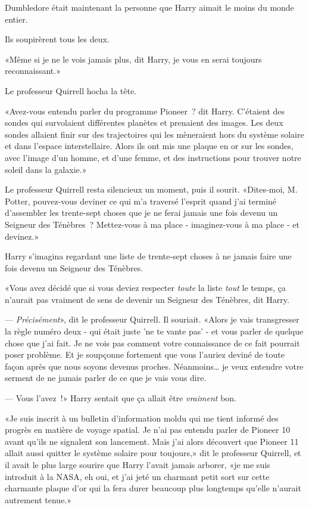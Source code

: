 Dumbledore était maintenant la personne que Harry aimait le moins du monde entier.

Ils soupirèrent tous les deux.

«Même si je ne le vois jamais plus, dit Harry, je vous en serai toujours reconnaissant.»

Le professeur Quirrell hocha la tête.

«Avez-vous entendu parler du programme Pioneer~? dit Harry. C'étaient des sondes qui survolaient différentes planètes et prenaient des images. Les deux sondes allaient finir sur des trajectoires qui les mèneraient hors du système solaire et dans l'espace interstellaire. Alors ils ont mis une plaque en or sur les sondes, avec l'image d'un homme, et d'une femme, et des instructions pour trouver notre soleil dans la galaxie.»

Le professeur Quirrell resta silencieux un moment, puis il sourit. «Dites-moi, M. Potter, pouvez-vous deviner ce qui m'a traversé l'esprit quand j'ai terminé d'assembler les trente-sept choses que je ne ferai jamais une fois devenu un Seigneur des Ténèbres~? Mettez-vous à ma place - imaginez-vous à ma place - et devinez.»

Harry s'imagina regardant une liste de trente-sept choses à ne jamais faire une fois devenu un Seigneur des Ténèbres.

«Vous avez décidé que si vous deviez respecter \emph{toute} la liste \emph{tout} le temps, ça n'aurait pas vraiment de sens de devenir un Seigneur des Ténèbres, dit Harry.

--- \emph{Précisément}», dit le professeur Quirrell. Il souriait. «Alors je vais transgresser la règle numéro deux - qui était juste 'ne te vante pas' - et vous parler de quelque chose que j'ai fait. Je ne vois pas comment votre connaissance de ce fait pourrait poser problème. Et je soupçonne fortement que vous l'auriez deviné de toute façon après que nous soyons devenus proches. Néanmoins… je veux entendre votre serment de ne jamais parler de ce que je vais vous dire.

--- Vous l'avez~!» Harry sentait que ça allait être \emph{vraiment} bon.

«Je suis inscrit à un bulletin d'information moldu qui me tient informé des progrès en matière de voyage spatial. Je n'ai pas entendu parler de Pioneer 10 avant qu'ils ne signalent son lancement. Mais j'ai alors découvert que Pioneer 11 allait aussi quitter le système solaire pour toujours,» dit le professeur Quirrell, et il avait le plus large sourire que Harry l'avait jamais arborer, «je me suis introduit à la NASA, eh oui, et j'ai jeté un charmant petit sort sur cette charmante plaque d'or qui la fera durer beaucoup plus longtemps qu'elle n'aurait autrement tenue.»

